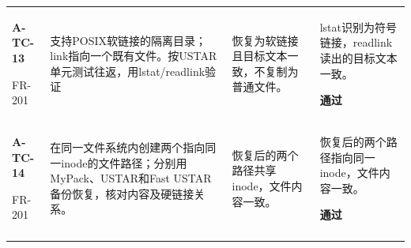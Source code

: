 \begin{longtable}{@{}L{.14\linewidth}L{.36\linewidth}L{.21\linewidth}L{.23\linewidth}@{}}
\textbf{A-TC-13}\par{\footnotesize FR-201} & 支持POSIX软链接的隔离目录；link指向一个既有文件。按USTAR单元测试往返，用lstat/readlink验证 & 恢复为软链接且目标文本一致，不复制为普通文件。 & lstat识别为符号链接，readlink读出的目标文本一致。\par\textbf{通过}\\\addlinespace[2pt]
\textbf{A-TC-14}\par{\footnotesize FR-201} & 在同一文件系统内创建两个指向同一inode的文件路径；分别用MyPack、USTAR和Fast USTAR备份恢复，核对内容及硬链接关系。 & 恢复后的两个路径共享inode，文件内容一致。 & 恢复后的两个路径指向同一inode，文件内容一致。\par\textbf{通过}\\\addlinespace[2pt]
\end{longtable}


